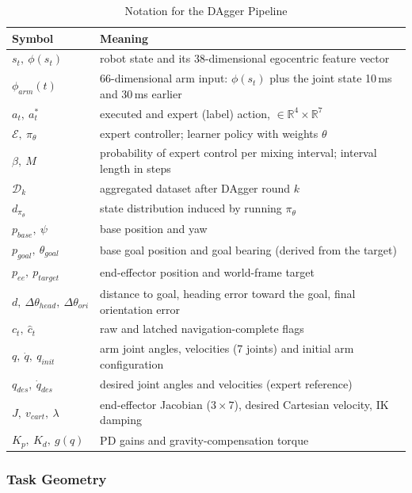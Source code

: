 \documentclass[conference]{IEEEtran}
\newcommand{\dagE}{\mathcal{E}}                        %
\newcommand{\dagPi}{\pi_\theta}                        %
\newcommand{\dagD}{\mathcal{D}}                        %
\begin{document}
\begin{table}[t]
\caption{Notation for the DAgger Pipeline}
\label{dag:tab:notation}
\centering
\footnotesize
\renewcommand{\arraystretch}{1.12}
\begin{tabular}{@{}p{2.5cm}p{5.7cm}@{}}
\toprule
\textbf{Symbol} & \textbf{Meaning}\\
\midrule
$s_t,\ \phi(s_t)$ & robot state and its 38-dimensional egocentric feature vector\\
$\phi_{arm}(t)$ & 66-dimensional arm input: $\phi(s_t)$ plus the joint state 10\,ms and 30\,ms earlier\\
$a_t,\ a_t^{*}$ & executed and expert (label) action, $\in\mathbb{R}^4\times\mathbb{R}^7$\\
$\dagE,\ \dagPi$ & expert controller; learner policy with weights $\theta$\\
$\beta,\ M$ & probability of expert control per mixing interval; interval length in steps\\
$\dagD_k$ & aggregated dataset after DAgger round $k$\\
$d_{\dagPi}$ & state distribution induced by running $\dagPi$\\
$p_{base},\ \psi$ & base position and yaw\\
$p_{goal},\ \theta_{goal}$ & base goal position and goal bearing (derived from the target)\\
$p_{ee},\ p_{target}$ & end-effector position and world-frame target\\
$d,\ \Delta\theta_{head},\ \Delta\theta_{ori}$ & distance to goal, heading error toward the goal, final orientation error\\
$c_t,\ \hat c_t$ & raw and latched navigation-complete flags\\
$q,\ \dot q,\ q_{init}$ & arm joint angles, velocities (7 joints) and initial arm configuration\\
$q_{des},\ \dot q_{des}$ & desired joint angles and velocities (expert reference)\\
$J,\ v_{cart},\ \lambda$ & end-effector Jacobian ($3\times7$), desired Cartesian velocity, IK damping\\
$K_p,\ K_d,\ g(q)$ & PD gains and gravity-compensation torque\\
\bottomrule
\end{tabular}
\end{table}

\subsubsection{Task Geometry}
\label{dag:geom-sec}
\end{document}
